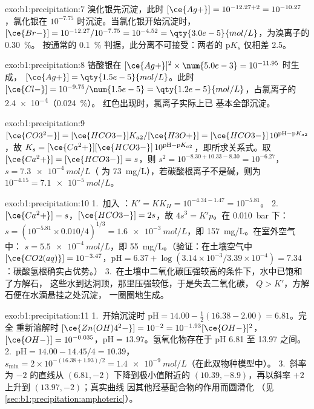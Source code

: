 \begin{solution}{exo:b1:precipitation:7}
溴化银先沉淀，此时 $[\ce{Ag+}] = 10^{-12.27 + 2} =
10^{-10.27}$，氯化银在 $10^{-7.75}$ 时沉淀。当氯化银开始沉淀时，
$[\ce{Br-}] = 10^{-12.27}/10^{-7.75} = 10^{-4.52} =
\qty{3.0e-5}{mol/L}$，为溴离子的 \qty{0.30}{\percent}。
按通常的 \qty{0.1}{\percent} 判据，此分离不可接受：两者的
$\mathrm{p}K_s$ 仅相差 2.5。
\end{solution}

\begin{solution}{exo:b1:precipitation:8}
铬酸银在 $[\ce{Ag+}]^2 \times \num{5.0e-3} = 10^{-11.95}$ 时生成，
$[\ce{Ag+}] = \qty{1.5e-5}{mol/L}$。此时 $[\ce{Cl-}] = 10^{-9.75}/\num{1.5e-5}
= \qty{1.2e-5}{mol/L}$，占氯离子的 \num{2.4e-4}（\qty{0.024}{\percent}）。
红色出现时，氯离子实际上已
基本全部沉淀。
\end{solution}

\begin{solution}{exo:b1:precipitation:9}
$[\ce{CO3^2-}] = [\ce{HCO3-}]K_{a2}/[\ce{H3O+}] = [\ce{HCO3-}]\,10^{\mathrm{pH}
- \mathrm{p}K_{a2}}$，故 $K_s = [\ce{Ca^2+}][\ce{HCO3-}]\,10^{\mathrm{pH} -
\mathrm{p}K_{a2}}$，即所求关系式。取 $[\ce{Ca^2+}] =
[\ce{HCO3-}] = s$，则 $s^2 = 10^{-8.30 + 10.33 - 8.30} = 10^{-6.27}$，
$s = \qty{7.3e-4}{mol/L}$（ 为 \qty{73}{mg/L}），若碳酸根离子不是碱，则为
$10^{-4.15} = \qty{7.1e-5}{mol/L}$。
\end{solution}

\begin{solution}{exo:b1:precipitation:10}
1.~加入 ：$K' = K K_H = 10^{-4.34 - 1.47} =
10^{-5.81}$。
2.~$[\ce{Ca^2+}] = s$，$[\ce{HCO3-}] = 2s$，故 $4s^3 = K'p$。在
\qty{0.010}{bar} 下：$s = (10^{-5.81} \times 0.010/4)^{1/3} =
\qty{1.6e-3}{mol/L}$，即 \qty{157}{mg/L}。在室外空气中：
$s = \qty{5.5e-4}{mol/L}$，即 \qty{55}{mg/L}。（验证：在土壤空气中
$[\ce{CO2(aq)}] = 10^{-3.47}$，$\mathrm{pH} = 6.37 + \log(3.14\times
10^{-3}/3.39 \times 10^{-4}) = 7.34$：碳酸氢根确实占优势。）
3.~在土壤中二氧化碳压强较高的条件下，水中已饱和了方解石，
这些水到达洞顶，那里压强较低，于是失去二氧化碳，
$Q > K'$，方解石便在水滴悬挂之处沉淀，
一圈圈地生成。
\end{solution}

\begin{solution}{exo:b1:precipitation:11}
1.~开始沉淀时 $\mathrm{pH} = 14.00 - \frac12(16.38 - 2.00) = 6.81$。完全
重新溶解时 $[\ce{Zn(OH)4^2-}] = 10^{-2} = 10^{-1.93}[\ce{OH-}]^2$，
$[\ce{OH-}] = 10^{-0.035}$，$\mathrm{pH} = 13.97$。氢氧化物存在于
pH 6.81 至 13.97 之间。
2.~$\mathrm{pH} = 14.00 - 14.45/4 = 10.39$，$s_{\min} = 2 \times
10^{-(16.38 + 1.93)/2} = \qty{1.4e-9}{mol/L}$（在此双物种模型中）。
3.~斜率为 $-2$ 的直线从 $(6.81, -2)$ 下降到极小值附近的
$(10.39, -8.9)$，再以斜率 $+2$ 上升到 $(13.97, -2)$；真实曲线
因其他羟基配合物的作用而圆滑化
（见\cref{sec:b1:precipitation:amphoteric}）。
\end{solution}

